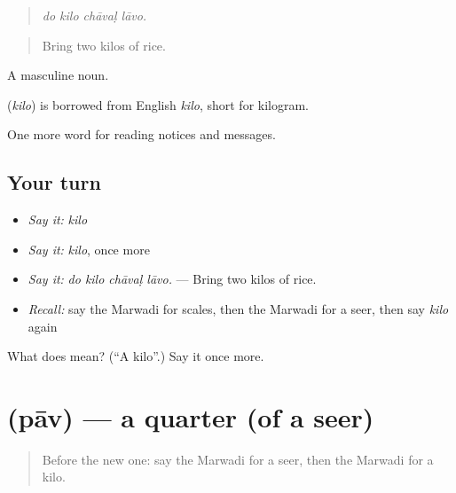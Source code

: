 \begin{quote}
   
\end{quote}

\begin{quote}
\emph{do kilo chāvaḷ lāvo.}
\end{quote}

\begin{quote}
Bring two kilos of rice.
\end{quote}

A masculine noun.

\begin{cousinweb}
\textbf{} (\emph{kilo}) is borrowed from English \emph{kilo}, short for kilogram.
\end{cousinweb}

\begin{grammarlens}[title={What you've built}]
One more word for reading notices and messages.
\end{grammarlens}

\subsection*{Your turn}
\begin{itemize}
\raggedright
  \item \emph{Say it:} \emph{kilo}
  \item \emph{Say it:} \emph{kilo}, once more
  \item \emph{Say it:} \emph{do kilo chāvaḷ lāvo.} — Bring two kilos of rice.
  \item \emph{Recall:} say the Marwadi for scales, then the Marwadi for a seer, then say \emph{kilo} again
\end{itemize}

\begin{tcolorbox}[breakable,colback=teal!4,colframe=teal!35!black,title={Before you move on}]
What does  mean? (\textquotedblleft{}A kilo\textquotedblright{}.) Say it once more.
\end{tcolorbox}
\section[\texorpdfstring{\mw{पाव} (pāv)}{पाव (pāv)}]{ (pāv) — a quarter (of a seer)}

\label{lesson:MW-C200-pav}



\begin{quote}
Before the new one: say the Marwadi for a seer, then the Marwadi for a kilo.
\end{quote}

